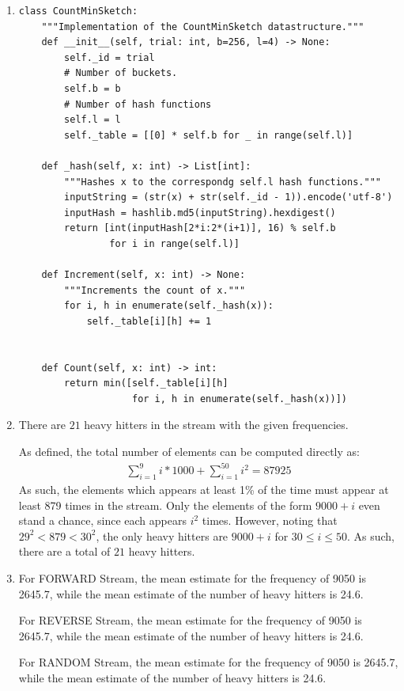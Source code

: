 \documentclass[12pt]{article}
\begin{document}
\begin{enumerate}[label=(\alph*)]
  \item 
\begin{verbatim}
class CountMinSketch:
    """Implementation of the CountMinSketch datastructure."""
    def __init__(self, trial: int, b=256, l=4) -> None:
        self._id = trial
        # Number of buckets.
        self.b = b
        # Number of hash functions
        self.l = l
        self._table = [[0] * self.b for _ in range(self.l)]
        
    def _hash(self, x: int) -> List[int]:
        """Hashes x to the correspondg self.l hash functions."""
        inputString = (str(x) + str(self._id - 1)).encode('utf-8')
        inputHash = hashlib.md5(inputString).hexdigest()
        return [int(inputHash[2*i:2*(i+1)], 16) % self.b
                for i in range(self.l)]
        
    def Increment(self, x: int) -> None:
        """Increments the count of x."""
        for i, h in enumerate(self._hash(x)):
            self._table[i][h] += 1
        
        
    def Count(self, x: int) -> int:
        return min([self._table[i][h]
                    for i, h in enumerate(self._hash(x))])
\end{verbatim}

  \item
    There are $21$ heavy hitters in the stream with the given frequencies.

    As defined, the total number of elements can be computed directly as:
    \begin{align*}
      \sum_{i=1}^9 i * 1000 + \sum_{i=1}^{50} i^2 = 87925
    \end{align*}
    As such, the elements which appears at least 1\% of the time must appear at least 879 times in the stream. Only the elements of the form $9000 + i$ even stand a chance, since each appears $i^2$ times. However, noting that $29^2 < 879 < 30^2$, the only heavy hitters are $9000 + i$ for $30 \leq i \leq 50$. As such, there are a total of $21$ heavy hitters.
  \item 
    For FORWARD Stream, the mean estimate for the frequency of 9050 is 2645.7, while the mean estimate of the number of heavy hitters is 24.6.
  
    For REVERSE Stream, the mean estimate for the frequency of 9050 is 2645.7, while the mean estimate of the number of heavy hitters is 24.6.

    For RANDOM Stream, the mean estimate for the frequency of 9050 is 2645.7, while the mean estimate of the number of heavy hitters is 24.6.


\end{enumerate}
\end{document}
